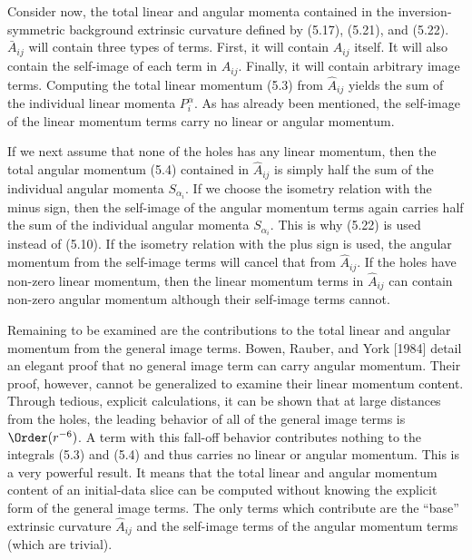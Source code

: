 Consider now, the total linear and angular momenta contained in the
inversion-symmetric background extrinsic curvature defined by (5.17), (5.21), and
(5.22).  $\bar{A}_{ij}$ will contain three types of terms.  First, it will contain
$\hat{A}_{ij}$ itself.  It will also contain the self-image of each term in
$\hat{A}_{ij}$.  Finally, it will contain arbitrary image terms.  Computing the
total linear momentum (5.3) from $\hat{A}_{ij}$ yields the sum of the individual
linear momenta $P^\alpha_i$.  As has already been mentioned, the self-image of the
linear momentum terms carry no linear or angular momentum.

If we next assume that none of the holes has any linear momentum, then the total
angular momentum (5.4) contained in $\hat{A}_{ij}$ is simply half the sum of the
individual angular momenta $S_{\alpha_i}$.  If we choose the isometry relation with
the minus sign, then the self-image of the angular momentum terms again carries half
the sum of the individual angular momenta $S_{\alpha_i}$.  This is why (5.22) is used
instead of (5.10).  If the isometry relation with the plus sign is used, the
angular momentum from the self-image terms will cancel that from $\hat{A}_{ij}$.  If
the holes have non-zero linear momentum, then the linear momentum terms in
$\hat{A}_{ij}$ can contain non-zero angular momentum although their self-image terms
cannot.

Remaining to be examined are the contributions to the total linear and angular
momentum from the general image terms.  Bowen, Rauber, and York [1984] detail an
elegant proof that no general image term can carry angular momentum.  Their
proof, however, cannot be generalized to examine their linear momentum content. 
Through tedious, explicit calculations, it can be shown that at large distances
from the holes, the leading behavior of all of the general image terms is
$\Order(r^{-6})$.  A term with this fall-off behavior contributes nothing to the
integrals (5.3) and (5.4) and thus carries no linear or angular momentum.  This is a
very powerful result.  It means that the total linear and angular momentum content
of an initial-data slice can be computed without knowing the explicit form of the
general image terms.  The only terms which contribute are the ``base'' extrinsic
curvature $\hat{A}_{ij}$ and the self-image terms of the angular momentum terms
(which are trivial).

